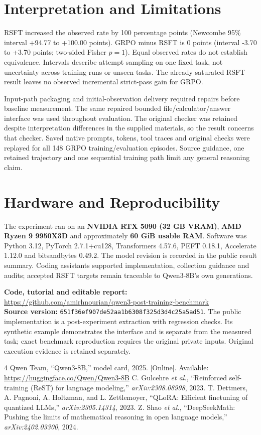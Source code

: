 \documentclass[10pt,journal,onecolumn,a4paper]{IEEEtran}
\begin{document}
\section{Interpretation and Limitations}
RSFT increased the observed rate by 100 percentage points (Newcombe 95\% interval +94.77 to +100.00 points). GRPO minus RSFT is 0 points (interval -3.70 to +3.70 points; two-sided Fisher $p=1$). Equal observed rates do not establish equivalence. Intervals describe attempt sampling on one fixed task, not uncertainty across training runs or unseen tasks. The already saturated RSFT result leaves no observed incremental strict-pass gain for GRPO.

Input-path packaging and initial-observation delivery required repairs before baseline measurement. The same repaired bounded file/calculator/answer interface was used throughout evaluation. The original checker was retained despite interpretation differences in the supplied materials, so the result concerns that checker. Saved native prompts, tokens, tool traces and original checks were replayed for all 148 GRPO training/evaluation episodes. Source guidance, one retained trajectory and one sequential training path limit any general reasoning claim.

\section{Hardware and Reproducibility}
The experiment ran on an \textbf{NVIDIA RTX 5090 (32 GB VRAM)}, \textbf{AMD Ryzen 9 9950X3D} and approximately \textbf{60 GiB usable RAM}. Software was Python 3.12, PyTorch 2.7.1+cu128, Transformers 4.57.6, PEFT 0.18.1, Accelerate 1.12.0 and bitsandbytes 0.49.2. The model revision is recorded in the public result summary. Coding assistants supported implementation, collection guidance and audits; accepted RSFT targets remain traceable to Qwen3-8B's own generations.

\noindent\textbf{Code, tutorial and editable report:}\\
\url{https://github.com/amirhnourian/qwen3-post-training-benchmark}\\
\textbf{Source version:} \texttt{651f36ef907de52aa1b6308f325d3d4c25a5ad51}. The public implementation is a post-experiment extraction with regression checks. Its synthetic example demonstrates the interface and is separate from the measured task; exact benchmark reproduction requires the original private inputs. Original execution evidence is retained separately.

\begin{thebibliography}{4}
 Qwen Team, ``Qwen3-8B,'' model card, 2025. [Online]. Available: \url{https://huggingface.co/Qwen/Qwen3-8B}
 C. Gulcehre \emph{et al.}, ``Reinforced self-training (ReST) for language modeling,'' \emph{arXiv:2308.08998}, 2023.
 T. Dettmers, A. Pagnoni, A. Holtzman, and L. Zettlemoyer, ``QLoRA: Efficient finetuning of quantized LLMs,'' \emph{arXiv:2305.14314}, 2023.
 Z. Shao \emph{et al.}, ``DeepSeekMath: Pushing the limits of mathematical reasoning in open language models,'' \emph{arXiv:2402.03300}, 2024.
\end{thebibliography}
\end{document}
